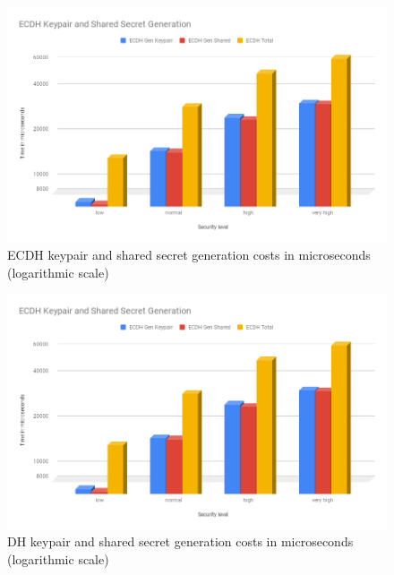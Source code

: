 				  \begin{figure}
					\centering
					\includegraphics[width=1.0\textwidth]{img/papi-ecdh-cost.png}
					\centering \caption{ECDH keypair and shared secret generation costs in microseconds (logarithmic scale)}
					\label{af:6}
				  \end{figure}
  
				  \begin{figure}
					\centering
					\includegraphics[width=1.0\textwidth]{img/papi-ecdh-cost.png}
					\centering \caption{DH keypair and shared secret generation costs in microseconds (logarithmic scale)}
					\label{af:7}
				  \end{figure}
  